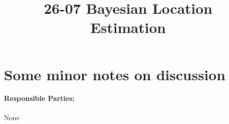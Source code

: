 \documentclass[11pt]{article}
\begin{document}
\title{26-07 Bayesian Location Estimation}

\maketitle

\section{Some minor notes on discussion}

\paragraph{Responsible Parties:} None
\end{document}
